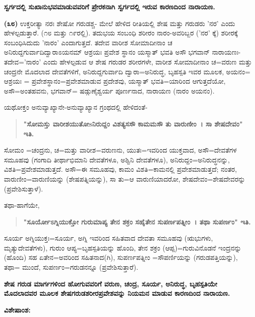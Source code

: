 \begin{center}
\textbf{ಸ್ವರ್ಗದಲ್ಲಿ ಸುಖಾನುಭವಮಾಡುವವರಿಗೆ ಪ್ರೇರಕನಾಗಿ ಸ್ವರ್ಗದಲ್ಲಿ ಇರುವ ಕಾರಣದಿಂದ ನಾರಾಯಣ.}
\end{center}

\textbf{(೩೮)} ಉಕ್ತರೀತ್ಯಾ ನರಃ ಶೇಷೋ ಗರುಡಶ್ಚ- ಮೇಲೆ ಹೇಳಿದ ರೀತಿಯಲ್ಲಿ ಶೇಷ ಮತ್ತು ಗರುಡರು 'ನರ' ಎಂದು ಹೇಳಲ್ಪಡುತ್ತಾರೆ. (೧೮ ಮತ್ತು ೧೯ರಲ್ಲಿ). ತದುಭಯ ಸಂಬಂಧಿ ಶರೀರಂ ನಾರಂ-ಅವರಿಬ್ಬರ ('ನರ' ಕ್ಕೆ) ಶರೀರಕ್ಕೆ ಸಂಬಂಧಿಸಿದುದು 'ನಾರಂ' ಎಂದಾಗುತ್ತದೆ. ತದೇವ ವಾರೀಶ ಸೋಮಾದೀನಾಂ ಚ ಅನಿರುದ್ದಗುರ್ವಾದಿದ್ವಾರಾಽಯನಮ್ ಆಶ್ರಯಃ ಪ್ರವೇಶ ಸ್ಥಾನಂ ಯಸ್ಮಾತ್ ಭವತಿ ಅಸೌ ಭಗವಾನ್ ನಾರಾಯಣಃ-ತದೇವ='ನಾರಂ' ಎಂದು ಹೇಳಲ್ಪಡುವ ಆ ಶೇಷ ಗರುಡರ ಶರೀರಗಳೇ, ವಾರೀಶ ಸೋಮಾದೀನಾಂ ಚ=ವರುಣ ಮತ್ತು ಚಂದ್ರನೇ ಮೊದಲಾದ ದೇವತೆಗಳಿಗೆ, ಅನಿರುದ್ದಗುರ್ವಾದಿ ದ್ವಾರಾ=ಅನಿರುದ್ಧ, ಬೃಹಸ್ಪತಿ ಇವರ ಮೂಲಕ, ಅಯನಂ= ಆಶ್ರಯಃ = ಪ್ರವೇಶಸ್ಥಾನಂ=ಪ್ರವೇಶಮಾಡುವ ಪ್ರದೇಶವು, ಯಸ್ಮಾತ್ ಭವತಿ=ಯಾರಿಂದ ಆಗುತ್ತದೆಯೋ, ಅಸೌ=ಅಂತಹವನು, ಭಗವಾನ್\-= ಷಡ್ಗುಣೈಶ್ವರ್ಯ ಪೂರ್ಣನಾದ, ನಾರಾಯಣ (ನಾರಂ ಅಯನಂ).

ಯಥೋಕ್ತಂ ಅನುವ್ಯಾಖ್ಯಾನೇ-ಅನುವ್ಯಾಖ್ಯಾನ ಗ್ರಂಥದಲ್ಲಿ ಹೇಳಿದಂತೆ-

\begin{verse}
\textbf{"ಸೋಮಸ್ತು ವಾರೀಶಯುತೋsನಿರುದ್ದಂ ವಿಶತ್ಯಸಸೌ ಕಾಮಮಸೌ ತು ವಾರುಣೀಂ~। ಸಾ ಶೇಷದೇವಂ" ಇತಿ.}
\end{verse}

ಸೋಮಂ =ಚಂದ್ರನು, ಚ=ಮತ್ತು ವಾರೀಶ=ವರುಣನು, ಯುತಃ=ಇವರಿಂದ ಯುಕ್ತವಾದ, ಅಸೌ=ದೇವತೆಗಳ ಸಮೂಹವು (ಗಂಗಾದಿ ತೀರ್ಥಾಭಿಮಾನಿ ದೇವತೆಗಳೂ, ಅಶ್ವಿನಿ ದೇವತೆಗಳೂ), ಅನಿರುದ್ದಂ=ಅನಿರುದ್ಧನನ್ನು, ವಿಶತಿ=ಪ್ರವೇಶಮಾಡುತ್ತದೆ. ಅಸೌ=ಈ ಸಮೂಹವು, ಕಾಮಂ ವಿಶತಿ=ಕಾಮನಲ್ಲಿ ಪ್ರವೇಶಮಾಡುತ್ತದೆ; ನಂತರ, ವಾರುಣೀಂ=\break ವಾರುಣಿಯನ್ನು (ಶೇಷಪತ್ನಿಯನ್ನು), ಸಾ ತು=ಆ ವಾರುಣಿಯಾದರೋ, ಶೇಷದೇವಂ=ಶೇಷ\-ದೇವರನ್ನು (ಪ್ರವೇಶಿಸುತ್ತಾಳೆ).

ತಥಾ-ಹಾಗೆಯೇ,

\begin{verse}
\textbf{"ಸೂರ್ಯೋಽಗ್ನಿಯುಕ್ತೋ ಗುರುಮಾಪ್ಯ ತೇನ ಶಕ್ರಂ ಸಹೈತೇನ ಸುಪರ್ಣಪತ್ನೀಂ~। ತಥಾ ಸುಪರ್ಣಂ" ಇತಿ.}
\end{verse}

ಸೂರ್ಯ ಅಗ್ನಿಯುಕ್ತಃ=ಸೂರ್ಯ, ಅಗ್ನಿ ಇವರಿಂದ ಸಹಿತವಾದ ದೇವತಾ ಸಮೂಹವು (ಋಭುಗಳು, ಮೃತ್ಯುದೇವತೆಗಳು), ಗುರುಂ ಆಪ್ಯ=ಬೃಹಸ್ಪತಿಯನ್ನು ಹೊಂದಿ, ತೇನ ಶಕ್ರಂ (ಆಪ್ಪ)=ಗುರುವಿನೊಡನೆ ಇಂದ್ರನನ್ನು (ಹೊಂದಿ) ಸಹ ಏತೇನ=ಅವರಿಂದ ಸಹಿತನಾದ(ಗಿ), ಸುಪರ್ಣಪತ್ನೀಂ =ಸೌಪರ್ಣಿಯನ್ನು (ಗರುಡಪತ್ತಿಯನ್ನು), ತಥಾ= ಮುಂದೆ, ಸುಪರ್ಣಂ=ಗರುಡನನ್ನೂ (ಪ್ರವೇಶಿಸುತ್ತಾರೆ).

\begin{center}
\textbf{ಶೇಷ ಗರುಡ ಮಾರ್ಗಗಳಿಂದ ಹೋಗುವವರಿಗೆ ವರುಣ, ಚಂದ್ರ, ಸೂರ್ಯ, ಅನಿರುದ್ಧ, ಬೃಹಸ್ಪತಿಯೇ ಮೊದಲಾದವರ ಮೂಲಕ ಶೇಷಗರುಡಶರೀರಪ್ರವೇಶವನ್ನು ನಿಯಮನ ಮಾಡುವ ಕಾರಣದಿಂದ ನಾರಾಯಣ.}
\end{center}

\noindent
\textbf{ವಿಶೇಷಾಂಶ:\enginline{-}}

